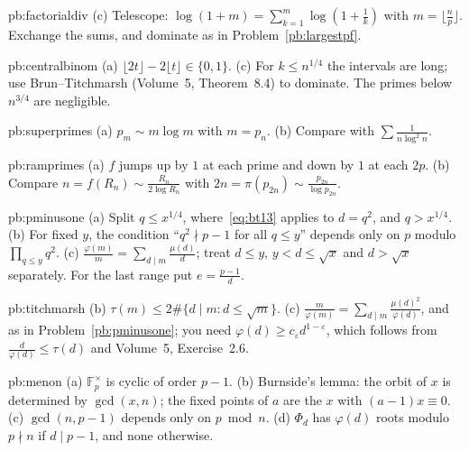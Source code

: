 \begin{hint}{pb:factorialdiv}
(c) Telescope: $\log(1+m)=\sum_{k=1}^m\log(1+\frac1k)$ with $m=\lfloor\frac np\rfloor$. Exchange the sums, and dominate as in Problem~\ref{pb:largestpf}.
\end{hint}

\begin{hint}{pb:centralbinom}
(a) $\lfloor2t\rfloor-2\lfloor t\rfloor\in\{0,1\}$. (c) For $k\le n^{1/4}$ the intervals are long; use Brun--Titchmarsh (Volume~5, Theorem~8.4) to dominate. The primes below
$n^{3/4}$ are negligible.
\end{hint}

\begin{hint}{pb:superprimes}
(a) $p_m\sim m\log m$ with $m=p_n$. (b) Compare with $\sum\frac1{n\log^2n}$.
\end{hint}

\begin{hint}{pb:ramprimes}
(a) $f$ jumps up by $1$ at each prime and down by $1$ at each $2p$. (b) Compare $n=f(R_n)\sim\frac{R_n}{2\log R_n}$ with $2n=\pi(p_{2n})\sim\frac{p_{2n}}{\log p_{2n}}$.
\end{hint}

\begin{hint}{pb:pminusone}
(a) Split $q\le x^{1/4}$, where~\eqref{eq:bt13} applies to $d=q^2$, and $q>x^{1/4}$. (b) For fixed $y$, the condition ``$q^2\nmid p-1$ for all $q\le y$'' depends only on $p$
modulo $\prod_{q\le y}q^2$. (c) $\frac{\varphi(m)}m=\sum_{d\mid m}\frac{\mu(d)}d$; treat $d\le y$, $y<d\le\sqrt x$ and $d>\sqrt x$ separately. For the last range put $e=\frac{p-1}d$.
\end{hint}

\begin{hint}{pb:titchmarsh}
(b) $\tau(m)\le2\#\{d\mid m:d\le\sqrt m\}$. (c) $\frac m{\varphi(m)}=\sum_{d\mid m}\frac{\mu(d)^2}{\varphi(d)}$, and as in Problem~\ref{pb:pminusone}; you need $\varphi(d)\ge c_\varepsilon d^{1-\varepsilon}$,
which follows from $\frac d{\varphi(d)}\le\tau(d)$ and Volume~5, Exercise~2.6.
\end{hint}

\begin{hint}{pb:menon}
(a) $\mathbb F_p^\times$ is cyclic of order $p-1$. (b) Burnside's lemma: the orbit of $x$ is determined by $\gcd(x,n)$; the fixed points of $a$ are the $x$ with $(a-1)x\equiv0$.
(c) $\gcd(n,p-1)$ depends only on $p\bmod n$. (d) $\Phi_d$ has $\varphi(d)$ roots modulo $p\nmid n$ if $d\mid p-1$, and none otherwise.
\end{hint}

